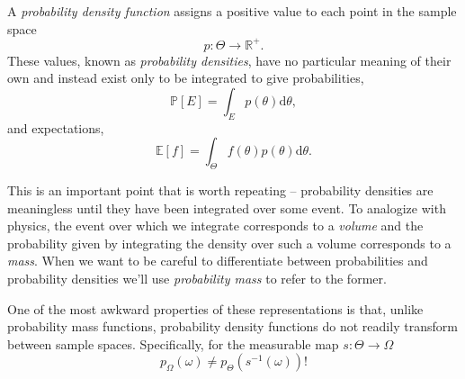 \documentclass[11pt, oneside]{article}
\newcommand{\dd}{ \mathrm{d} }
\newcommand{\PP}{ \mathbb{P} }
\begin{document}
A \emph{probability density function} assigns a positive value to each
point in the sample space
%
\begin{equation*}
p : \Theta \rightarrow \mathbb{R}^{+}.
\end{equation*}
%
These values, known as \emph{probability densities}, have no particular 
meaning of their own and instead exist only to be integrated to give 
probabilities,
%
\begin{equation*}
\PP \! \left[ E \right]
=
\int_{E} p \! \left( \theta \right) \dd \theta,
\end{equation*}
%
and expectations,
%
\begin{equation*}
\mathbb{E} \! \left[ f \right]
=
\int_{\Theta} f \! \left( \theta \right) p \! \left( \theta \right) \dd \theta.
\end{equation*}

This is an important point that is worth repeating -- probability densities 
are meaningless until they have been integrated over some event.  To 
analogize with physics, the event over which we integrate corresponds 
to a \emph{volume} and the probability given by integrating the density 
over such a volume corresponds to a \emph{mass}.  When we want to 
be careful to differentiate between probabilities and probability densities 
we'll use \emph{probability mass} to refer to the former.

One of the most awkward properties of these representations is that, 
unlike probability mass functions, probability density functions do not
readily transform between sample spaces.  Specifically, for the
measurable map $s : \Theta \rightarrow \Omega$
%
\begin{equation*}
p_{\Omega} \! \left( \omega \right)
\neq
p_{\Theta} \! \left( s^{-1} \! \left( \omega \right) \right)!
\end{equation*}
\end{document}
